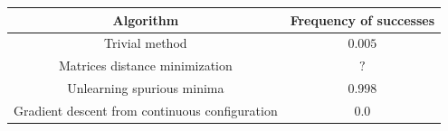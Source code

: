 \begin{tabular}{cc}
\toprule
Algorithm                                      & Frequency of successes \\ \midrule
Trivial method                           & $0.005$                \\
Matrices distance minimization                 & $?$                    \\ 
Unlearning spurious minima                     & $0.998$                    \\
Gradient descent from continuous configuration & $0.0$                    \\
\bottomrule
\end{tabular}
